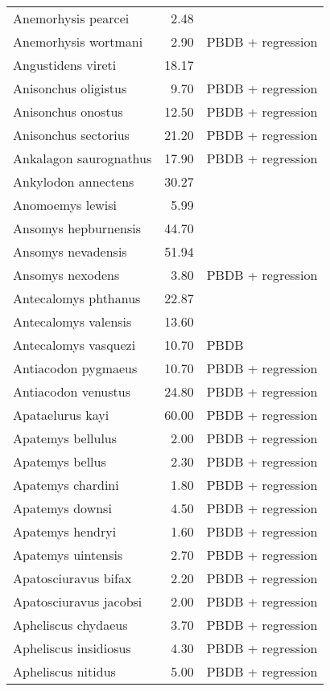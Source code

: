 \begin{table}[ht]
\begin{tabular}{lrl}
  Anemorhysis pearcei & 2.48 & \cite{Albright2000} \\ 
  Anemorhysis wortmani & 2.90 & PBDB + regression \\ 
  Angustidens vireti & 18.17 & \cite{Tomiya2013} \\ 
  Anisonchus oligistus & 9.70 & PBDB + regression \\ 
  Anisonchus onostus & 12.50 & PBDB + regression \\ 
  Anisonchus sectorius & 21.20 & PBDB + regression \\ 
  Ankalagon saurognathus & 17.90 & PBDB + regression \\ 
  Ankylodon annectens & 30.27 & \cite{Tomiya2013} \\ 
  Anomoemys lewisi & 5.99 & \cite{Simons1960} \\ 
  Ansomys hepburnensis & 44.70 & \cite{Tomiya2013} \\ 
  Ansomys nevadensis & 51.94 & \cite{Tomiya2013} \\ 
  Ansomys nexodens & 3.80 & PBDB + regression \\ 
  Antecalomys phthanus & 22.87 & \cite{Tomiya2013} \\ 
  Antecalomys valensis & 13.60 & \cite{Tomiya2013} \\ 
  Antecalomys vasquezi & 10.70 & PBDB \\ 
  Antiacodon pygmaeus & 10.70 & PBDB + regression \\ 
  Antiacodon venustus & 24.80 & PBDB + regression \\ 
  Apataelurus kayi & 60.00 & PBDB + regression \\ 
  Apatemys bellulus & 2.00 & PBDB + regression \\ 
  Apatemys bellus & 2.30 & PBDB + regression \\ 
  Apatemys chardini & 1.80 & PBDB + regression \\ 
  Apatemys downsi & 4.50 & PBDB + regression \\ 
  Apatemys hendryi & 1.60 & PBDB + regression \\ 
  Apatemys uintensis & 2.70 & PBDB + regression \\ 
  Apatosciuravus bifax & 2.20 & PBDB + regression \\ 
  Apatosciuravus jacobsi & 2.00 & PBDB + regression \\ 
  Apheliscus chydaeus & 3.70 & PBDB + regression \\ 
  Apheliscus insidiosus & 4.30 & PBDB + regression \\ 
  Apheliscus nitidus & 5.00 & PBDB + regression \\ 

\end{tabular}
\end{table}
